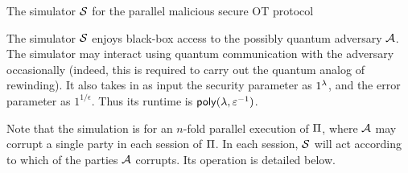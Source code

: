 



\begin{AlgorithmBox}[label={fig:OT-Sim}]{The simulator $\mathcal{S}$ for the parallel malicious secure OT protocol}

 The simulator $\mathcal{S}$ enjoys black-box access to the possibly quantum adversary $\mathcal{A}$. The simulator may interact using quantum communication with the adversary occasionally (indeed, this is required to carry out the quantum analog of rewinding). It also takes in as input the security parameter as $1^\lambda$, and the error parameter as $1^{1/\epsilon}$. Thus its runtime is $\mathsf{poly}(\lambda,\varepsilon^{-1})$. 

 Note that the simulation is for an $n$-fold parallel execution of $\mathrm{\Pi}$, where $\mathcal{A}$ may corrupt a single party in each session of $\mathrm{\Pi}$. In each session, $\mathcal{S}$ will act according to which of the parties $\mathcal{A}$ corrupts. Its operation is detailed below. 


\end{AlgorithmBox}

